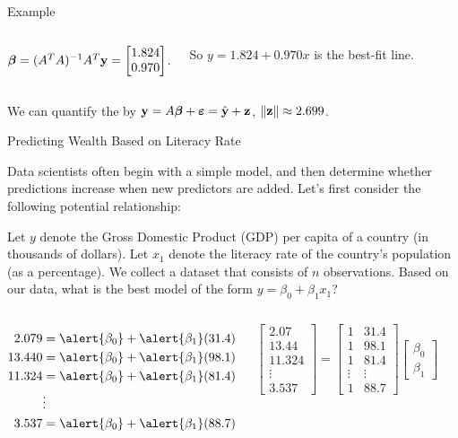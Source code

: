 \documentclass[xcolor=dvipsnames,aspectratio=169,t]{beamer}
\begin{document}
\begin{frame}{Example}
\begin{columns}[T]
  \hspace*{3em} $\boldsymbol\beta =(A^T A)^{-1} A^T \mathbf{y} = 
    \begin{bmatrix} 1.824 \\ 0.970 \end{bmatrix}$.
  \smallskip
  
  So $y=1.824 + 0.970x$ is the \alert{best-fit line}.
  \end{columns}
  \bigskip
  
  \pause
  We can quantify the  by $\mathbf{y} = A\boldsymbol\beta + \boldsymbol\varepsilon = \hat{\mathbf{y}}+ \mathbf{z}$, $\|\mathbf{z}\| \approx 2.699$.
\end{frame}


\begin{frame}{Predicting Wealth Based on Literacy Rate}

  {\small Data scientists often begin with a simple model, and then determine whether predictions increase when new predictors are added. Let's first consider the following potential relationship:}

  {\small
  \bi
  \ii Let $y$ denote the Gross Domestic Product (GDP) per capita of a country (in thousands of dollars).
  \ii Let $x_{1}$ denote the literacy rate of the country's population (as a percentage).
  \ii We collect a dataset that consists of $n$ observations.
  \ii Based on our data, what is the best model of the form $y = \beta_0 + \beta_1 x_1$?
  \ei
  }

  \vspace{-0.1in}

  \begin{columns}[T]

  \column{0.33\tw}

  \begin{align*}
  2.079 &= \alert{\beta_0} + \alert{\beta_1} (31.4) \\
  13.440 &= \alert{\beta_0} + \alert{\beta_1} (98.1) \\
  11.324 &= \alert{\beta_0} + \alert{\beta_1} (81.4) \\
  & \vdots  \\
  3.537 &= \alert{\beta_0} + \alert{\beta_1} (88.7) \\ 
  \end{align*}

  \column{0.33\tw}

  \[ \begin{bmatrix} 2.07 \\ 13.44 \\ 11.324 \\ \vdots \\ 3.537 \end{bmatrix} = \begin{bmatrix} 1 & 31.4 \\ 1 & 98.1 \\ 1 & 81.4 \\  \vdots &  \vdots \\ 1 & 88.7 \end{bmatrix} \begin{bmatrix} \beta_0 \\ \beta_1 \end{bmatrix} \]


\end{columns}
\end{frame}
\end{document}

